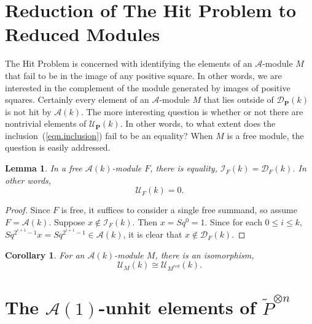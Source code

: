 \documentclass{amsart}
\theoremstyle{plain}
\newtheorem{lemma}[theorem]{Lemma}
\newtheorem{corollary}[theorem]{Corollary}
\theoremstyle{definition}
\theoremstyle{remark}
\begin{document}
\section{Reduction of The Hit Problem to Reduced Modules}

The Hit Problem is concerned with identifying the elements of an
$\mathcal{A}$-module $M$ that fail to be in the image of any positive
square.  In other words, we are interested in the complement of the
module generated by images of positive squares.  Certainly every
element of an $\mathcal{A}$-module $M$ that lies outside of
$\mathcal{D}_{\mathbf{P}}(k)$ is not hit by $\mathcal{A}(k)$.  The
more interesting question is whether or not there are nontrivial
elements of $\mathcal{U}_{\mathbf{P}}(k)$.  In other words, to what
extent does the inclusion~(\ref{eqn.inclusion}) fail to be an
equality?  When $M$ is a free module, the question is easily
addressed.
\begin{lemma}\label{lem.free_modules}
  In a free $\mathcal{A}(k)$-module $F$, there is equality,
  $\mathcal{I}_F(k) = \mathcal{D}_F(k)$.  In other words,
  \[
    \mathcal{U}_F(k) = 0.
  \]
\end{lemma}
\begin{proof}
  Since $F$ is free, it suffices to consider a single free summand, so
  assume $F = \mathcal{A}(k)$.  Suppose $x \notin \mathcal{I}_F(k)$.
  Then $x = Sq^0 = 1$.  Since for each $0 \leq i \leq k$,
  $Sq^{2^{i+1}-1}x = Sq^{2^{i+1}-1} \in \mathcal{A}(k)$, it is clear
  that $x \notin \mathcal{D}_F(k)$.
\end{proof}
\begin{corollary}\label{cor.reduced}
  For an $\mathcal{A}(k)$-module $M$, there is an isomorphism,
  \[
    \mathcal{U}_{M}(k) \cong \mathcal{U}_{M^{red}}(k).
  \]
\end{corollary}

\section{The $\mathcal{A}(1)$-unhit elements of $\widetilde{P}^{\otimes n}$}
\end{document}
